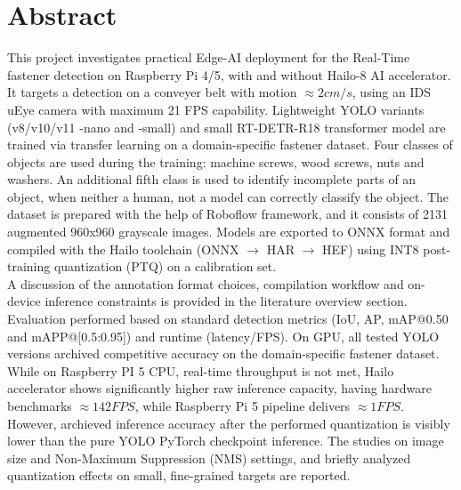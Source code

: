 \documentclass[12pt,a4paper]{report}
\begin{document}
\chapter*{Abstract}
This project investigates practical Edge-AI deployment for the Real-Time fastener detection on
Raspberry Pi 4/5, with and without Hailo-8 AI accelerator. It targets a detection on a
conveyer belt with motion \( \approx 2 cm/s\), using an IDS uEye camera with maximum 21 FPS capability.
Lightweight YOLO variants (v8/v10/v11 -nano and -small) and small RT-DETR-R18 transformer model
are trained via transfer learning on a domain-specific fastener dataset.
Four classes of objects are used during the training: machine screws, wood screws, nuts
and washers. An additional fifth class is used to identify incomplete parts of an object, when neither
a human, not a model can correctly classify the object. The dataset is prepared with the help of Roboflow
framework, and it consists of 2131 augmented
960x960 grayscale images. Models are exported to ONNX format and compiled with the Hailo toolchain
(ONNX \(\to\) HAR \(\to\) HEF) using INT8 post-training quantization (PTQ) on a calibration set.  \\
A discussion of the annotation format choices, compilation workflow and on-device inference constraints is
provided in the literature overview section. \\
Evaluation performed based on standard detection metrics
(IoU, AP, mAP@0.50 and mAPP@[0.5:0.95]) and runtime
(latency/FPS). On GPU, all tested YOLO versions archived competitive accuracy on the domain-specific fastener
dataset. While on Raspberry PI 5 CPU, real-time throughput is not met, Hailo accelerator shows significantly
higher raw inference capacity, having hardware benchmarks \( \approx 142 FPS\), while Raspberry Pi 5 pipeline
delivers \( \approx 1 FPS\). However, archieved inference accuracy after
the performed quantization is visibly lower than the pure YOLO PyTorch checkpoint inference.
The studies on image size and Non-Maximum Suppression (NMS) settings, and briefly analyzed quantization effects on small,
fine-grained targets are reported.
\end{document}
